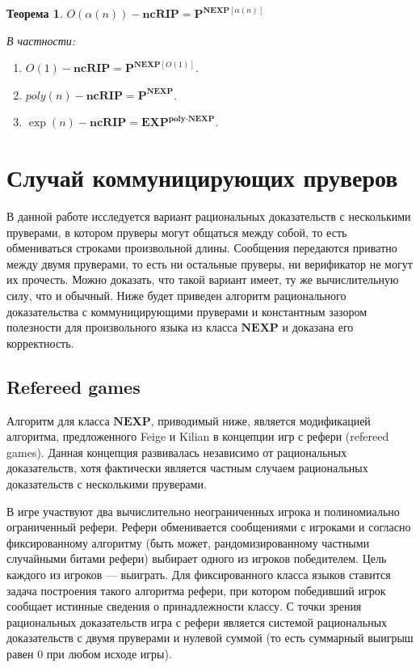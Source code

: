 \documentclass[14pt, a4paper]{extreport}
\newtheorem{theorem}{\indent Теорема}
\begin{document}
        \begin{theorem}
            $O(\alpha(n))-\textbf{ncRIP} = \textbf{P}^{\textbf{NEXP}\left[\alpha(n)\right]}$

            В частности:
            \begin{enumerate}
                \item $ O(1)-\textbf{ncRIP} = {\textbf{P}}^{\textbf{NEXP}[O(1)] }$.
                \item $\textit{poly}(n)-\textbf{ncRIP} = \textbf{P}^{\textbf{NEXP}}$.
                \item $\exp(n)-\textbf{ncRIP} = \textbf{EXP}^{\textbf{poly-NEXP}}$.
            \end{enumerate}
        \end{theorem}


        \chapter{Случай коммуницирующих пруверов}

        В данной работе исследуется вариант рациональных доказательств с несколькими пруверами, в котором пруверы могут общаться между собой, то есть обмениваться строками произвольной длины. Сообщения передаются приватно между двумя пруверами, то есть ни остальные пруверы, ни верификатор не могут их прочесть. Можно доказать, что такой вариант имеет, ту же вычислительную силу, что и обычный. Ниже будет приведен алгоритм рационального доказательства с коммуницирующими пруверами и константным зазором полезности для произвольного языка из класса $\textbf{NEXP}$ и доказана его корректность.

        \section{Refereed games}
        Алгоритм для класса $\textbf{NEXP}$, приводимый ниже, является модификацией алгоритма, предложенного Feige и Kilian \cite{feige1997refereed} в концепции игр с рефери (refereed games). Данная концепция развивалась независимо от рациональных доказательств, хотя фактически является частным случаем рациональных доказательств с несколькими пруверами.

        В игре участвуют два вычислительно неограниченных игрока и полиномиально ограниченный рефери. Рефери обменивается сообщениями с игроками и согласно фиксированному алгоритму (быть может, рандомизированному частными случайными битами рефери) выбирает одного из игроков победителем. Цель каждого из игроков --- выиграть. Для фиксированного класса языков ставится задача построения такого алгоритма рефери, при котором победивший игрок сообщает истинные сведения о принадлежности классу. С точки зрения рациональных доказательств игра с рефери является системой рациональных доказательств с двумя пруверами и нулевой суммой (то есть суммарный выигрыш равен $0$ при любом исходе игры).
\end{document}
